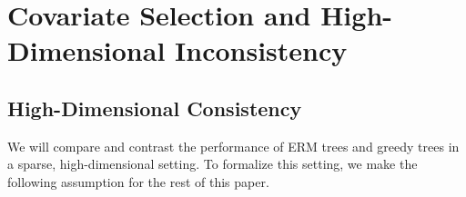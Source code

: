 \documentclass[11pt]{article}
\newcommand{\bx}{\mathbf{x}}
\DeclarePairedDelimiter{\paren}{(}{)}
\newcommand{\node}{\mathfrak{t}}
\newcommand{\data}[1][n]{\mathcal{D}_{#1}}
\begin{document}
\section{Covariate Selection and High-Dimensional Inconsistency}

\subsection{High-Dimensional Consistency}

We will compare and contrast the performance of ERM trees and greedy trees in a sparse, high-dimensional setting.
To formalize this setting, we make the following assumption for the rest of this paper.
\end{document}
